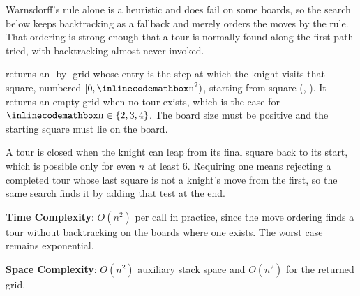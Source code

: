Warnsdorff's rule alone is a heuristic and does fail on some boards, so the search below keeps backtracking as a fallback and merely orders the moves by the rule. That ordering is strong enough that a tour is normally found along the first path tried, with backtracking almost never invoked.

\begin{compactitem}
  \item {} returns an -by- grid whose entry is the step at which the knight visits that square, numbered $[0, {\inlinecodemath{n}}^2)$, starting from square (, ). It returns an empty grid when no tour exists, which is the case for ${\inlinecodemath{n}} \in \{2, 3, 4\}$. The board size must be positive and the starting square must lie on the board.
\end{compactitem}

A tour is closed when the knight can leap from its final square back to its start, which is possible only for even $n$ at least $6$. Requiring one means rejecting a completed tour whose last square is not a knight's move from the first, so the same search finds it by adding that test at the end.

\textbf{Time Complexity}: $O(n^{2})$ per call in practice, since the move ordering finds a tour without backtracking on the boards where one exists. The worst case remains exponential.

\textbf{Space Complexity}: $O(n^{2})$ auxiliary stack space and $O(n^{2})$ for the returned grid.

